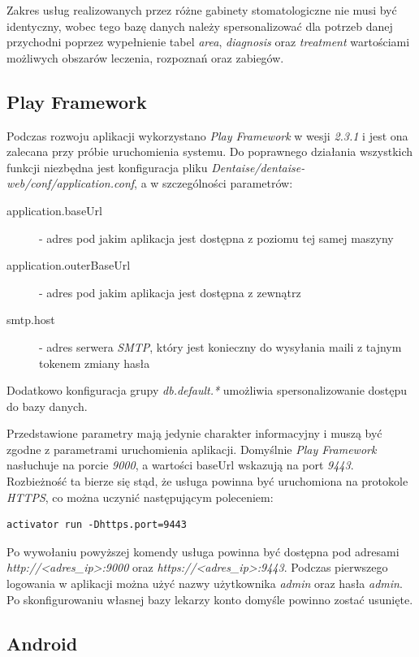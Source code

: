 \documentclass[11pt]{aghdpl}
\begin{document}
Zakres usług realizowanych przez różne gabinety stomatologiczne nie musi być identyczny, wobec tego bazę danych należy spersonalizować dla potrzeb danej przychodni poprzez wypełnienie tabel \emph{area}, \emph{diagnosis} oraz \emph{treatment} wartościami możliwych obszarów leczenia, rozpoznań oraz zabiegów.

\subsection{Play Framework}
\label{sec:playFramework}

Podczas rozwoju aplikacji wykorzystano \emph{Play Framework} w wesji \emph{2.3.1} i jest ona zalecana przy próbie uruchomienia systemu. Do poprawnego działania wszystkich funkcji niezbędna jest konfiguracja pliku \emph{Dentaise/dentaise-web/conf/application.conf}, a w szczególności parametrów:
\begin{description}
\item[application.baseUrl] - adres pod jakim aplikacja jest dostępna z poziomu tej samej maszyny
\item[application.outerBaseUrl] - adres pod jakim aplikacja jest dostępna z zewnątrz
\item[smtp.host] - adres serwera \emph{SMTP}, który jest konieczny do wysyłania maili z tajnym tokenem zmiany hasła
\end{description}
Dodatkowo konfiguracja grupy \emph{db.default.*} umożliwia spersonalizowanie dostępu do bazy danych.

Przedstawione parametry mają jedynie charakter informacyjny i muszą być zgodne z parametrami uruchomienia aplikacji. Domyślnie \emph{Play Framework} nasłuchuje na porcie \emph{9000}, a wartości baseUrl wskazują na port \emph{9443}. Rozbieżność ta bierze się stąd, że usługa powinna być uruchomiona na protokole \emph{HTTPS}, co można uczynić następującym poleceniem:

\begin{lstlisting}
activator run -Dhttps.port=9443
\end{lstlisting}

Po wywołaniu powyższej komendy usługa powinna być dostępna pod adresami \emph{http://<adres\_ip>:9000} oraz \emph{https://<adres\_ip>:9443}. Podczas pierwszego logowania w aplikacji można użyć nazwy użytkownika \emph{admin} oraz hasła \emph{admin}. Po skonfigurowaniu własnej bazy lekarzy konto domyśle powinno zostać usunięte.

\subsection{Android}
\end{document}

